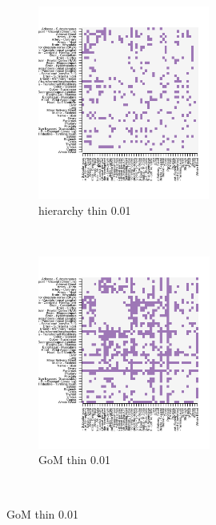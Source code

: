  \begin{figure}[ht]
    \centering    
     \begin{subfigure}[t]{0.5\textwidth}
        \centering
        \includegraphics[height=2.5in]{../plots/rsz_1hierarchy_F_thin_0_01.png}
        \caption{hierarchy thin 0.01}
    \end{subfigure}%
    ~
    \begin{subfigure}[t]{0.5\textwidth}
        \centering
        \includegraphics[height=2.5in]{../plots/rsz_1admixture_F_thin_0_01.png}
        \caption{GoM thin 0.01}
    \end{subfigure}\\
    

\end{figure}
